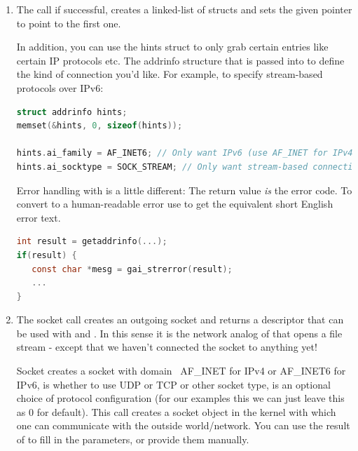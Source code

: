 \begin{enumerate}

\item {}

The  call if successful, creates a linked-list of  structs and sets the given pointer to point to the first one.

In addition, you can use the hints struct to only grab certain entries like certain IP protocols etc. The addrinfo structure that is passed into  to define the kind of connection you'd like.
For example, to specify stream-based protocols over IPv6:

\begin{lstlisting}[language=C]
struct addrinfo hints;
memset(&hints, 0, sizeof(hints));

hints.ai_family = AF_INET6; // Only want IPv6 (use AF_INET for IPv4)
hints.ai_socktype = SOCK_STREAM; // Only want stream-based connection
\end{lstlisting}
Error handling with  is a little different: The return value \emph{is} the error code. To convert to a human-readable error use  to get the equivalent short English error text.

\begin{lstlisting}[language=C]
int result = getaddrinfo(...);
if(result) { 
   const char *mesg = gai_strerror(result); 
   ...
}
\end{lstlisting}


\item {}

The socket call creates an outgoing socket and returns a descriptor that can be used with  and .
In this sense it is the network analog of  that opens a file stream - except that we haven't connected the socket to anything yet!

Socket creates a socket with domain
~AF\_INET for IPv4 or AF\_INET6 for IPv6,  is whether to use UDP or TCP or other socket type,  is an optional choice of protocol configuration (for our examples this we can just leave this as 0 for default).
This call creates a socket object in the kernel with which one can communicate with the outside world/network.
You can use the result of  to fill in the  parameters, or provide them manually.


\end{enumerate}
